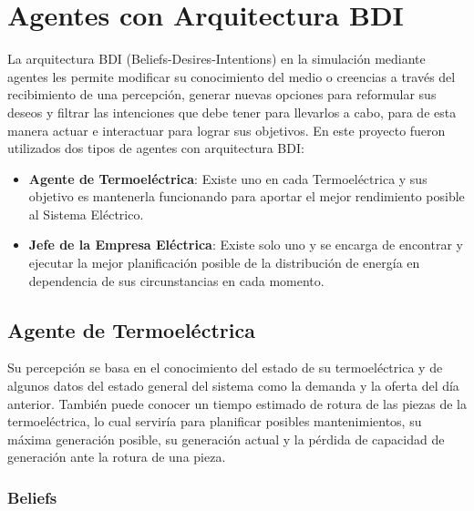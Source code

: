 \documentclass[twocolumn, fontsize=10pt]{article}
\begin{document}
\section{Agentes con Arquitectura BDI}

La arquitectura BDI (Beliefs-Desires-Intentions) en la simulación mediante agentes
les permite modificar su conocimiento del medio o creencias a través del recibimiento
de una percepción, generar nuevas opciones para reformular sus deseos y filtrar las intenciones
que debe tener para llevarlos a cabo, para de esta manera actuar e interactuar para lograr sus objetivos. \cite{book}
En este proyecto fueron utilizados dos tipos de agentes con arquitectura BDI:
\begin{itemize}
  \item \textbf{Agente de Termoeléctrica}: Existe uno en cada Termoeléctrica y sus objetivo es mantenerla funcionando para aportar el mejor rendimiento posible al Sistema Eléctrico.
  \item \textbf{Jefe de la Empresa Eléctrica}: Existe solo uno y se encarga de encontrar y ejecutar la mejor planificación posible de la distribución de energía en dependencia de sus circunstancias en cada momento.
\end{itemize}

\subsection{Agente de Termoeléctrica}
Su percepción se basa en el conocimiento del estado de su 
termoeléctrica y de algunos datos del estado general del 
sistema como la demanda y la oferta del día anterior. 
También puede conocer un tiempo estimado de rotura de las 
piezas de la termoeléctrica, lo cual serviría para planificar 
posibles mantenimientos, su máxima generación posible, su generación actual y
la pérdida de capacidad de generación ante la rotura de una pieza.
\subsubsection{Beliefs}
\end{document}
